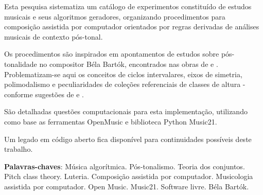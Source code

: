 \documentclass[
	12pt,				%
	openright,			%
	twoside,			%
	a4paper,			%
	english,			%
	french,				%
	spanish,			%
	brazil				%
	]{abntex2}
\begin{document}











\setlength{\absparsep}{18pt} %



\begin{resumo}


Esta pesquisa sistematiza um catálogo de experimentos constituído de estudos musicais e seus algoritmos geradores, organizando procedimentos para composição assistida por computador orientados por regras derivadas de análises musicais de contexto pós-tonal.


Os procedimentos são inspirados em apontamentos de estudos sobre pós-tonalidade no compositor Béla Bartók, encontrados nas obras de  e  . Problematizam-se aqui os conceitos de ciclos intervalares, eixos de simetria, polimodalismo e peculiaridades de coleções referenciais de classes de altura - conforme sugestões de 
 e .

São detalhadas questões computacionais para esta implementação, utilizando como base as ferramentas OpenMusic e biblioteca Python Music21. 

Um legado em código aberto fica disponível para continuidades possíveis deste trabalho.


 \textbf{Palavras-chaves}: Música algorítmica. Pós-tonalismo. Teoria dos conjuntos. Pitch class theory. Luteria. Composição assistida por computador. Musicologia assistida por computador. Open Music. Music21. Software livre. Béla Bartók.
\end{resumo}
\end{document}

